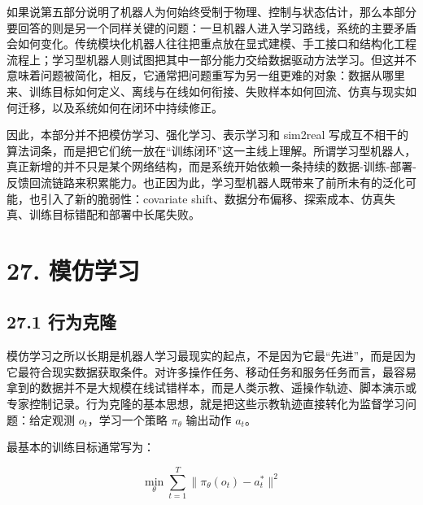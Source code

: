 

如果说第五部分说明了机器人为何始终受制于物理、控制与状态估计，那么本部分要回答的则是另一个同样关键的问题：一旦机器人进入学习路线，系统的主要矛盾会如何变化。传统模块化机器人往往把重点放在显式建模、手工接口和结构化工程流程上；学习型机器人则试图把其中一部分能力交给数据驱动方法学习。但这并不意味着问题被简化，相反，它通常把问题重写为另一组更难的对象：数据从哪里来、训练目标如何定义、离线与在线如何衔接、失败样本如何回流、仿真与现实如何迁移，以及系统如何在闭环中持续修正。

因此，本部分并不把模仿学习、强化学习、表示学习和 sim2real 写成互不相干的算法词条，而是把它们统一放在“训练闭环”这一主线上理解。所谓学习型机器人，真正新增的并不只是某个网络结构，而是系统开始依赖一条持续的数据-训练-部署-反馈回流链路来积累能力。也正因为此，学习型机器人既带来了前所未有的泛化可能，也引入了新的脆弱性：covariate shift、数据分布偏移、探索成本、仿真失真、训练目标错配和部署中长尾失败。

\section*{27. 模仿学习}

\subsection*{27.1 行为克隆}


模仿学习之所以长期是机器人学习最现实的起点，不是因为它最“先进”，而是因为它最符合现实数据获取条件。对许多操作任务、移动任务和服务任务而言，最容易拿到的数据并不是大规模在线试错样本，而是人类示教、遥操作轨迹、脚本演示或专家控制记录。行为克隆的基本思想，就是把这些示教轨迹直接转化为监督学习问题：给定观测 \(o_t\)，学习一个策略 \(\pi_\theta\) 输出动作 \(a_t\)。

最基本的训练目标通常写为：

\begingroup
\footnotesize
\begin{equation*}
\min_{\theta} \sum_{t=1}^{T} \lVert \pi_{\theta}(o_t) - a_t^\ast \rVert^2
\end{equation*}
\endgroup

